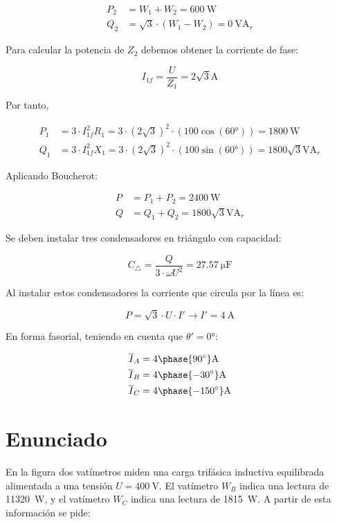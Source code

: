 \begin{align*}
  P_2 &= W_1 + W_2 = \SI{600}{\watt}\\
  Q_2 &= \sqrt{3}\cdot (W_1 - W_2) = \SI{0}{\volt\ampere_r}
\end{align*}

Para calcular la potencia de $Z_2$ debemos obtener la corriente de fase:

\[
  I_{1f} = \frac{U}{Z_1} = {2\sqrt{3}}\unit{\ampere}
\]

Por tanto,

\begin{align*}
  P_1 &= 3 \cdot I_{1f}^2 R_1 = 3 \cdot (2\sqrt{3})^2 \cdot (100\cos(\ang{60})) = \SI{1800}{\watt}\\
  Q_1 &= 3 \cdot I_{1f}^2 X_1 = 3 \cdot (2\sqrt{3})^2 \cdot (100\sin(\ang{60})) = {1800\sqrt{3}}\unit{\volt\ampere_r}
\end{align*}

Aplicando Boucherot:

\begin{align*}
  P &= P_1 + P_2 = \SI{2400}{\watt}\\
  Q &= Q_1 + Q_2 = {1800\sqrt{3}}\unit{\volt\ampere_r}
\end{align*}

Se deben instalar tres condensadores en triángulo con capacidad:

\[
  C_\triangle = \frac{Q}{3 \cdot \omega U^2} = \SI{27.57}{\micro\farad}
\]

Al instalar estos condensadores la corriente que circula por la línea es:

\[
  P = \sqrt{3} \cdot U \cdot I' \rightarrow I' = \SI{4}{\ampere}
\]

En forma fasorial, teniendo en cuenta que $\theta' = \ang{0}$:

\begin{align*}
  \overline{I}_A &= {4\phase{\ang{90}}}\unit{\ampere}\\
  \overline{I}_B &= {4\phase{\ang{-30}}}\unit{\ampere}\\
  \overline{I}_C &= {4\phase{\ang{-150}}}\unit{\ampere}
\end{align*}





\section{Enunciado}

En la figura dos vatímetros miden una carga trifásica inductiva
equilibrada alimentada a una tensión $U = \SI{400}{\volt}$. El
vatímetro $W_B$ indica una lectura de \SI{11320}{\watt}, y el
vatímetro $W_C$ indica una lectura de \SI{1815}{\watt}. A partir de
esta información se pide:

